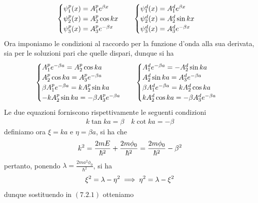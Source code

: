 \documentclass{article}
\begin{document}
\begin{gather}
    \begin{cases}
        \psi_1^p(x) = A_1^pe^{\beta x} \\
        \psi_2^p(x) = A_2^p\cos kx \\
        \psi_3^p(x) = A_3^pe^{-\beta x}
    \end{cases} \quad
    \begin{cases}
        \psi_1^d(x) = A_1^de^{\beta x} \\
        \psi_2^d(x) = A_2^d\sin kx \\
        \psi_3^d(x) = A_3^de^{-\beta x} \notag
    \end{cases}
\end{gather}
Ora imponiamo le condizioni al raccordo per la funzione d'onda alla sua derivata, sia per le soluzioni pari che quelle dispari, dunque si ha
\begin{gather}
    \begin{cases}
        A_1^pe^{-\beta a} = A_2^p\cos ka \\
        A_2^p\cos ka = A_3^pe^{-\beta a} \\
        \beta A_1^pe^{-\beta a} = kA_2^p\sin ka \\
        -kA_2^p\sin ka = -\beta A_3^pe^{-\beta a}
    \end{cases} \quad
    \begin{cases}
        A_1^de^{-\beta a} = -A_2^d\sin ka \\
        A_2^d\sin ka = A_3^de^{-\beta a} \\
        \beta A_1^de^{-\beta a} = kA_2^d\cos ka \\
        kA_2^d\cos ka = -\beta A_3^de^{-\beta a}
    \end{cases} \notag
\end{gather}
Le due equazioni forniscono rispettivamente le seguenti condizioni
\begin{gather}
    k\tan ka = \beta \quad k\cot ka = -\beta \tag{7.2.1}
\end{gather}
definiamo ora $\xi = ka$ e $\eta = \beta a$, si ha che
\begin{gather}
    k^2 = \frac{2mE}{\hbar^2} + \frac{2m\phi_0}{\hbar^2} = \frac{2m\phi_0}{\hbar^2} - \beta^2 \notag
\end{gather}
pertanto, ponendo $\lambda = \frac{2ma^2\phi_0}{\hbar^2}$, si ha
\begin{gather}
    \xi^2 = \lambda - \eta^2 \implies \eta^2 = \lambda - \xi^2 \notag
\end{gather}
dunque sostituendo in $(7.2.1)$ otteniamo
\end{document}
